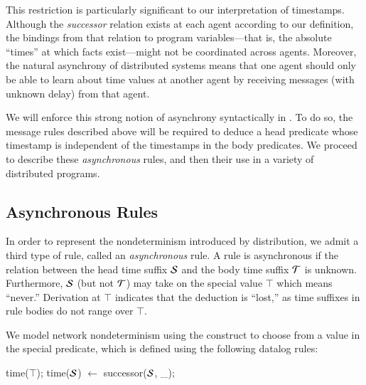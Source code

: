 This restriction is 
particularly significant to our interpretation of timestamps.  Although the \emph{successor} relation exists
at each agent according to our definition, the bindings from that relation to program variables---that is, the absolute ``times'' at which facts exist---might not be coordinated across agents.  Moreover, the natural asynchrony of distributed systems means that one agent should only be able to learn about time values at another agent by receiving messages (with unknown delay) from that agent.  

We will enforce this strong notion of asynchrony syntactically in 
\lang.  To do so, the message rules described above will be required to  deduce a head predicate whose timestamp is independent
of the timestamps in the body predicates.  We proceed to describe these {\em asynchronous} rules, and then their use in a variety of distributed programs.

\subsection{Asynchronous Rules}


In order to represent the nondeterminism introduced by distribution, we admit a
third type of rule, called an {\em asynchronous} rule.  A rule is asynchronous
if the 
relation between the head time suffix $\SDedalus$ and the body time suffix $\Tau$ is
unknown.  Furthermore, $\SDedalus$ (but not $\Tau$) may take on the special value
$\top$ which means ``never.''  Derivation at $\top$ indicates that the
deduction is ``lost,'' as time suffixes in rule bodies do not range over
$\top$.

We model network nondeterminism using the  construct to choose
from a value in the special 
predicate, which is defined using the following datalog rules:

\begin{Dedalus}
time(\(\top\));
time(\(\SDedalus\)) \(\leftarrow\) successor(\(\SDedalus\), _);
\end{Dedalus}

